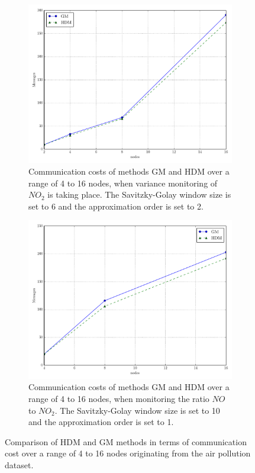 \begin{figure}[!htb]
\begin{subfigure}{0.49\textwidth}
  \includegraphics[width=\linewidth]{img/actual_msg_NO2_sq_2014_nodes_wl_6_order_2.pdf}
  \caption{Communication costs of methods GM and HDM over a range of 4 to 16 nodes, when variance monitoring of $NO_2$ is taking place. The Savitzky-Golay window size is set to 6 and the approximation order is set to 2.}
\end{subfigure}\hfill
\begin{subfigure}{0.49\textwidth}
  \includegraphics[width=\linewidth]{img/actual_msg_NO2_NO_2014_nodes.pdf}
  \caption{Communication costs of methods GM and HDM over a range of 4 to 16 nodes, when monitoring the ratio $NO$ to $NO_2$. The Savitzky-Golay window size is set to 10 and the approximation order is set to 1.}
\end{subfigure}\hfill
\vspace{0.5cm}
\caption{Comparison of HDM and GM methods in terms of communication cost over a range of 4 to 16 nodes originating from the air pollution dataset.} \label{fig:actualComp}
\end{figure}

